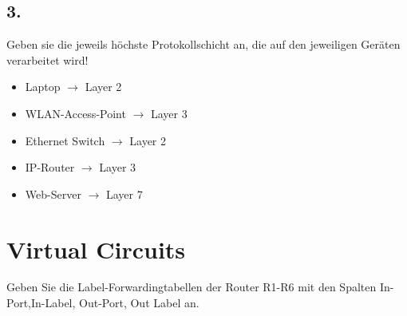 \documentclass[paper=a4, fontsize=11pt]{scrartcl}
\numberwithin{equation}{section}
\numberwithin{figure}{section}
\numberwithin{table}{section}
\begin{document}
\subsection{3.}
Geben sie die jeweils höchste Protokollschicht an, die auf den jeweiligen Geräten verarbeitet wird! \\

\begin{itemize}
\item Laptop $\rightarrow$ Layer 2
\item WLAN-Access-Point $\rightarrow$ Layer 3
\item Ethernet Switch $\rightarrow$ Layer 2
\item IP-Router $\rightarrow$ Layer 3
\item Web-Server $\rightarrow$ Layer 7
\end{itemize}


\section{Virtual Circuits}
Geben Sie die Label-Forwardingtabellen der Router R1-R6 mit den Spalten In-Port,In-Label, Out-Port, Out Label an. \\
\end{document}
